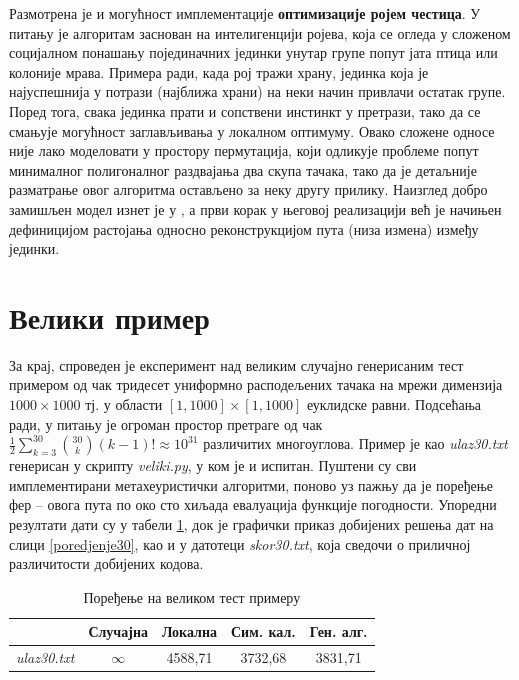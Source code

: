 \documentclass[a4paper]{article}
\begin{document}
Размотрена је и могућност имплементације \textbf{оптимизације ројем честица}. У питању је алгоритам заснован на интелигенцији ројева, која се огледа у сложеном социјалном понашању појединачних јединки унутар групе попут јата птица или колоније мрава. Примера ради, када рој тражи храну, јединка која је најуспешнија у потрази (најближа храни) на неки начин привлачи остатак групе. Поред тога, свака јединка прати и сопствени инстинкт у претрази, тако да се смањује могућност заглављивања у локалном оптимуму. Овако сложене односе није лако моделовати у простору пермутација, који одликује проблеме попут минималног полигоналног раздвајања два скупа тачака, тако да је детаљније разматрање овог алгоритма остављено за неку другу прилику. Наизглед добро замишљен модел изнет је у \cite{clerc}, а први корак у његовој реализацији већ је начињен дефиницијом растојања односно реконструкцијом пута (низа измена) између јединки.

\section{Велики пример}

За крај, спроведен је експеримент над великим случајно генерисаним тест примером од чак тридесет униформно расподељених тачака на мрежи димензија $1000 \times 1000$ тј. у области $[1, 1000] \times [1, 1000]$ еуклидске равни. Подсећања ради, у питању је огроман простор претраге од чак $\frac{1}{2} \sum_{k=3}^{30} {30 \choose k} (k-1)! \approx 10^{31}$ различитих многоуглова. Пример је као \textit{ulaz30.txt} генерисан у скрипту \textit{veliki.py}, у ком је и испитан. Пуштени су сви имплементирани метахеуристички алгоритми, поново уз пажњу да је поређење фер -- овога пута по око сто хиљада евалуација функције погодности. Упоредни резултати дати су у табели \ref{veliki}, док је графички приказ добијених решења дат на слици \ref{poredjenje30}, као и у датотеци \textit{skor30.txt}, која сведочи о приличној различитости добијених кодова.

\begin{table}[h!]
\begin{center}
\caption{Поређење на великом тест примеру}
\begin{tabular}{| c | c c c c |} \hline
& Случајна & Локална & Сим. кал. & Ген. алг.\\ \hline
\textit{ulaz30.txt} & $\infty$ & 4588,71 & 3732,68 & 3831,71\\ \hline
\end{tabular}
\label{veliki}
\end{center}
\end{table}
\end{document}
